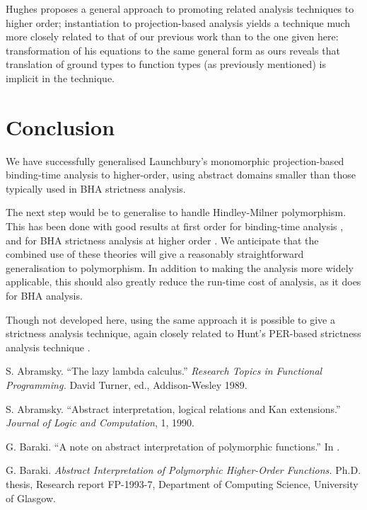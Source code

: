 \begin{article}
Hughes \cite{Hug88} proposes a general approach to promoting related
analysis techniques to higher order; instantiation to projection-based
analysis yields a technique much more closely related to that of our
previous work \cite{Dav93b} than to the one given here: transformation
of his equations to the same general form as ours reveals that
translation of ground types to function types (as previously mentioned)
is implicit in the technique.

\section{Conclusion}

We have successfully generalised Launchbury's monomorphic
projection-based binding-time analysis to higher-order, using abstract
domains smaller than those typically used in BHA strictness analysis.

The next step would be to generalise to handle Hindley-Milner
polymorphism.  This has been done with good results at first order for
binding-time analysis \cite{Lau91a}, and for BHA strictness analysis
at higher order \cite{Bar91,Bar93}.  We anticipate that the combined
use of these theories will give a reasonably straightforward
generalisation to polymorphism.  In addition to making the analysis
more widely applicable, this should also greatly reduce the run-time
cost of analysis, as it does for BHA analysis.

Though not developed here, using the same approach it is possible to
give a strictness analysis technique, again closely related to Hunt's
PER-based strictness analysis technique \cite{Hun91}.


\begin{thebibliography}{123456}

S. Abramsky. 
``The lazy lambda calculus.'' 
{\it Research Topics in Functional Programming.}
David Turner, ed., Addison-Wesley 1989.

S. Abramsky. 
``Abstract interpretation, logical relations and Kan extensions.''
{\it Journal of Logic and Computation}, 1, 1990.

G. Baraki.
``A note on abstract interpretation of polymorphic functions.''
In \cite{Hug91}.

G. Baraki.
{\it Abstract Interpretation of Polymorphic Higher-Order Functions.}
Ph.D. thesis, Research report FP-1993-7, 
Department of Computing Science, University of Glasgow.


\end{thebibliography}
\end{article}
